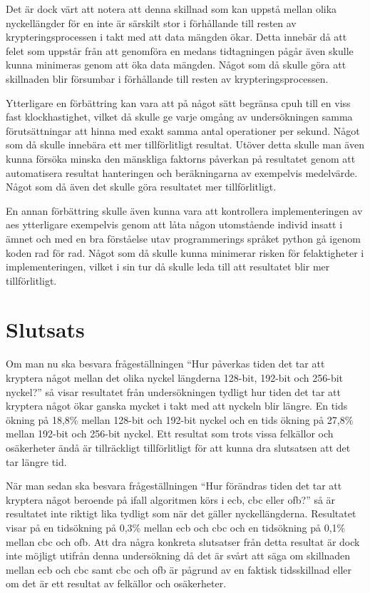 Det är dock värt att notera att denna skillnad som kan uppstå mellan olika nyckellängder för en inte är särskilt stor i förhållande till resten av krypteringsprocessen
i takt med att data mängden ökar. Detta innebär då att felet som uppstår från att genomföra en medans tidtagningen pågår även skulle kunna minimeras genom att
öka data mängden. Något som då skulle göra att skillnaden blir försumbar i förhållande till resten av krypteringsprocessen.%

Ytterligare en förbättring kan vara att på något sätt begränsa \gls{cpuh} till en viss fast klockhastighet, vilket då skulle ge varje omgång av undersökningen samma förutsättningar
att hinna med exakt samma antal operationer per sekund. Något som då skulle innebära ett mer tillförlitligt resultat. Utöver detta skulle man även kunna försöka minska den mänskliga faktorns
påverkan på resultatet genom att automatisera resultat hanteringen och beräkningarna av exempelvis medelvärde. Något som då även det skulle göra resultatet mer tillförlitligt. %

En annan förbättring skulle även kunna vara att kontrollera implementeringen av \acrshort{aes} ytterligare exempelvis genom att låta någon utomstående individ insatt i ämnet och
med en bra förståelse utav programmerings språket \gls{python} gå igenom koden rad för rad. Något som då skulle kunna minimerar risken för felaktigheter i implementeringen,
vilket i sin tur då skulle leda till att resultatet blir mer tillförlitligt. %

\section{Slutsats} %
\label{sec:conclusion}
Om man nu ska besvara frågeställningen “Hur påverkas tiden det tar att kryptera något mellan det olika nyckel längderna 128-bit, 192-bit och 256-bit nyckel?” så visar resultatet från
undersökningen tydligt hur tiden det tar att kryptera något ökar ganska mycket i takt med att nyckeln blir längre. En tids ökning på 18,8\% mellan 128-bit och 192-bit nyckel och en tids ökning på 27,8\%
mellan 192-bit och 256-bit nyckel. Ett resultat som trots vissa felkällor och osäkerheter ändå är tillräckligt tillförlitligt för att kunna dra slutsatsen att det tar längre tid.

När man sedan ska besvara frågeställningen “Hur förändras tiden det tar att kryptera något beroende på ifall algoritmen körs i \acrshort{ecb}, \acrshort{cbc} eller \acrshort{ofb}?” så är resultatet inte
riktigt lika tydligt som när det gäller nyckellängderna. Resultatet visar på en tidsökning på 0,3\% mellan \acrshort{ecb} och \acrshort{cbc} och en tidsökning på 0,1\% mellan \acrshort{cbc} och
\acrshort{ofb}. Att dra några konkreta slutsatser från detta resultat är dock inte möjligt utifrån denna undersökning då det är svårt att säga om skillnaden mellan \acrshort{ecb} och \acrshort{cbc} samt
\acrshort{cbc} och \acrshort{ofb} är pågrund av en faktisk tidsskillnad eller om det är ett resultat av felkällor och osäkerheter.

